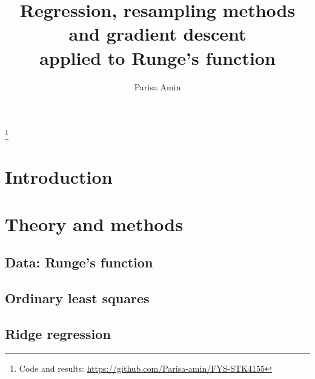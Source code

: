 \documentclass[aps,rmp,reprint,amsmath,amssymb,graphicx,longbibliography]{revtex4-1}
\begin{document}
\title{Regression, resampling methods and gradient descent\\
       applied to Runge's function}

\author{Parisa Amin}
\thanks{Code and results: \url{https://github.com/Parisa-amin/FYS-STK4155}}

\begin{abstract}
\end{abstract}

\maketitle

\section{Introduction}

\section{Theory and methods}\label{sec:theory}

\subsection{Data: Runge's function}

\subsection{Ordinary least squares}

\subsection{Ridge regression}
\end{document}
